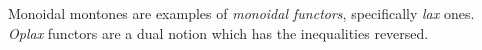 Monoidal montones are examples of \emph{monoidal functors}, specifically \emph{lax} ones.  \emph{Oplax} functors are a dual notion which has the inequalities reversed.
